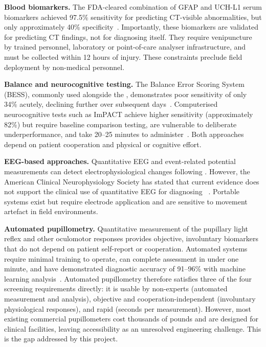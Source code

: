 \textbf{Blood biomarkers.} The FDA-cleared combination of GFAP and UCH-L1 serum biomarkers achieved 97.5\% sensitivity for predicting CT-visible abnormalities, but only approximately 40\% specificity~\cite{bazarian2018blood}. Importantly, these biomarkers are validated for predicting CT findings, not for diagnosing  itself. They require venipuncture by trained personnel, laboratory or point-of-care analyser infrastructure, and must be collected within 12 hours of injury. These constraints preclude field deployment by non-medical personnel.

\textbf{Balance and neurocognitive testing.} The Balance Error Scoring System (BESS), commonly used alongside the , demonstrates poor sensitivity of only 34\% acutely, declining further over subsequent days~\cite{bell2011bess}. Computerised neurocognitive tests such as ImPACT achieve higher sensitivity (approximately 82\%) but require baseline comparison testing, are vulnerable to deliberate underperformance, and take 20--25 minutes to administer~\cite{schatz2006impact}. Both approaches depend on patient cooperation and physical or cognitive effort.

\textbf{EEG-based approaches.} Quantitative EEG and event-related potential measurements can detect electrophysiological changes following . However, the American Clinical Neurophysiology Society has stated that current evidence does not support the clinical use of quantitative EEG for diagnosing ~\cite{nuwer2021qeeg}. Portable systems exist but require electrode application and are sensitive to movement artefact in field environments.

\textbf{Automated pupillometry.} Quantitative measurement of the pupillary light reflex and other oculomotor responses provides objective, involuntary biomarkers that do not depend on patient self-report or cooperation. Automated systems require minimal training to operate, can complete assessment in under one minute, and have demonstrated diagnostic accuracy of 91--96\% with machine learning analysis~\cite{maxin2024smartphone}. Automated pupillometry therefore satisfies three of the four screening requirements directly: it is usable by non-experts (automated measurement and analysis), objective and cooperation-independent (involuntary physiological responses), and rapid (seconds per measurement). However, most existing commercial pupillometers cost thousands of pounds and are designed for clinical facilities, leaving accessibility as an unresolved engineering challenge. This is the gap addressed by this project.

